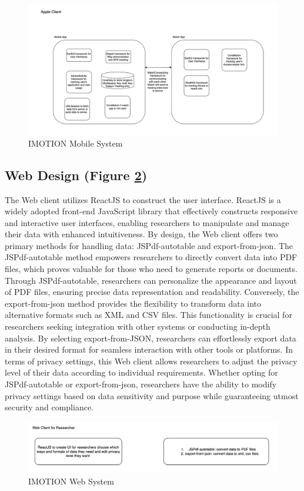 \documentclass[12pt,two side]{report}
\begin{document}
\begin{figure}
\centering
\includegraphics[width=12cm]{background_report/figures/mobile-system.png}
\caption{IMOTION Mobile System}
\label{figure:3}
\end{figure}

\subsection{Web Design (Figure \ref{figure:4})}
The Web client utilizes ReactJS to construct the user interface. ReactJS is a widely adopted front-end JavaScript library that effectively constructs responsive and interactive user interfaces, enabling researchers to manipulate and manage their data with enhanced intuitiveness. By design, the Web client offers two primary methods for handling data: JSPdf-autotable and export-from-json. The JSPdf-autotable method empowers researchers to directly convert data into PDF files, which proves valuable for those who need to generate reports or documents. Through JSPdf-autotable, researchers can personalize the appearance and layout of PDF files, ensuring precise data representation and readability. Conversely, the export-from-json method provides the flexibility to transform data into alternative formats such as XML and CSV files. This functionality is crucial for researchers seeking integration with other systems or conducting in-depth analysis. By selecting export-from-JSON, researchers can effortlessly export data in their desired format for seamless interaction with other tools or platforms. In terms of privacy settings, this Web client allows researchers to adjust the privacy level of their data according to individual requirements. Whether opting for JSPdf-autotable or export-from-json, researchers have the ability to modify privacy settings based on data sensitivity and purpose while guaranteeing utmost security and compliance.
\begin{figure}
\centering
\includegraphics[width=12cm]{background_report/figures/web-system.png}
\caption{IMOTION Web System}
\label{figure:4}
\end{figure}
\end{document}
